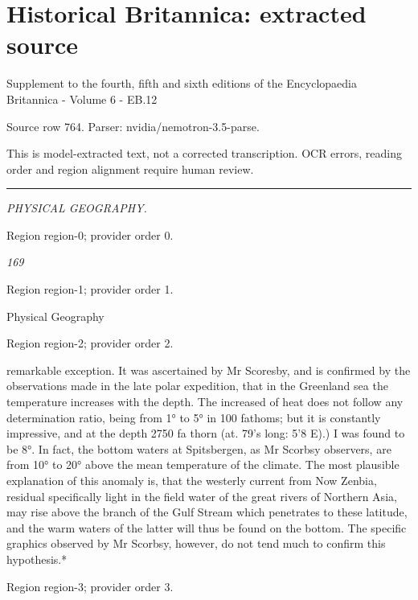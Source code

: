 \documentclass[11pt]{article}
\begin{document}
\section*{Historical Britannica: extracted source}
Supplement to the fourth, fifth and sixth editions of the Encyclopaedia Britannica - Volume 6 - EB.12\par
{\small Source row 764. Parser: nvidia/nemotron-3.5-parse.\par}
{\small This is model-extracted text, not a corrected transcription. OCR errors, reading order and region alignment require human review.\par}
\hrule\medskip
{\small\itshape PHYSICAL GEOGRAPHY.\par}

{\scriptsize\color{gray} Region region-0; provider order 0.\par}
\medskip

{\small\itshape 169\par}

{\scriptsize\color{gray} Region region-1; provider order 1.\par}
\medskip

Physical Geography
\par

{\scriptsize\color{gray} Region region-2; provider order 2.\par}
\medskip

remarkable exception. It was ascertained by Mr Scoresby, and is confirmed by the observations made in the late polar expedition, that in the Greenland sea the temperature increases with the depth. The increased of heat does not follow any determination ratio, being from 1° to 5° in 100 fathoms; but it is constantly impressive, and at the depth 2750 fa thorn (at. 79’s long: 5’8 E).) I was found to be 8°. In fact, the bottom waters at Spitsbergen, as Mr Scorbsy observers, are from 10° to 20° above the mean temperature of the climate. The most plausible explanation of this anomaly is, that the westerly current from Now Zenbia, residual specifically light in the field water of the great rivers of Northern Asia, may rise above the branch of the Gulf Stream which penetrates to these latitude, and the warm waters of the latter will thus be found on the bottom. The specific graphics observed by Mr Scorbsy, however, do not tend much to confirm this hypothesis.*
\par

{\scriptsize\color{gray} Region region-3; provider order 3.\par}
\medskip
\end{document}
